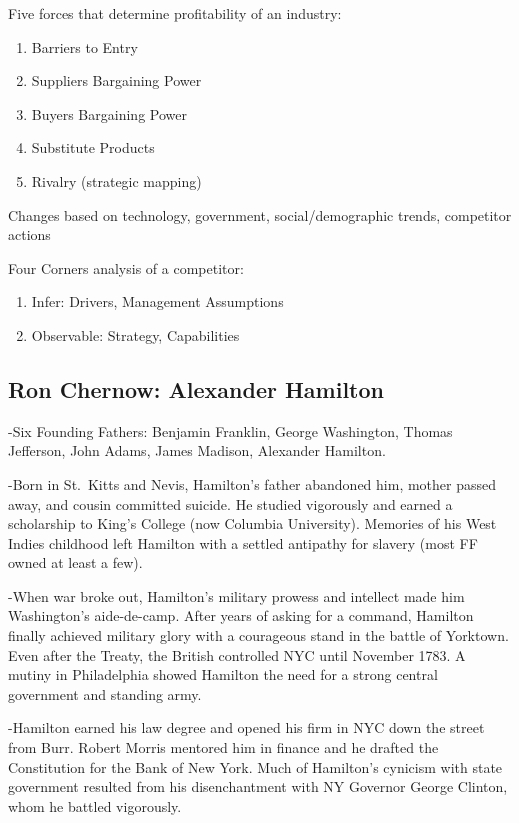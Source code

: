 \documentclass[
]{article}
\begin{document}
Five forces that determine profitability of an industry:

\begin{enumerate}
\def\labelenumi{\arabic{enumi}.}
\item
  Barriers to Entry
\item
  Suppliers Bargaining Power
\item
  Buyers Bargaining Power
\item
  Substitute Products
\item
  Rivalry (strategic mapping)
\end{enumerate}

Changes based on technology, government, social/demographic trends,
competitor actions

Four Corners analysis of a competitor:

\begin{enumerate}
\def\labelenumi{\arabic{enumi}.}
\item
  Infer: Drivers, Management Assumptions
\item
  Observable: Strategy, Capabilities
\end{enumerate}

\hypertarget{ron-chernow-alexander-hamilton}{%
\subsection{Ron Chernow: Alexander
Hamilton}\label{ron-chernow-alexander-hamilton}}

-Six Founding Fathers: Benjamin Franklin, George Washington, Thomas
Jefferson, John Adams, James Madison, Alexander Hamilton.

-Born in St.~Kitts and Nevis, Hamilton's father abandoned him, mother
passed away, and cousin committed suicide. He studied vigorously and
earned a scholarship to King's College (now Columbia University).
Memories of his West Indies childhood left Hamilton with a settled
antipathy for slavery (most FF owned at least a few).

-When war broke out, Hamilton's military prowess and intellect made him
Washington's aide-de-camp. After years of asking for a command, Hamilton
finally achieved military glory with a courageous stand in the battle of
Yorktown. Even after the Treaty, the British controlled NYC until
November 1783. A mutiny in Philadelphia showed Hamilton the need for a
strong central government and standing army.

-Hamilton earned his law degree and opened his firm in NYC down the
street from Burr. Robert Morris mentored him in finance and he drafted
the Constitution for the Bank of New York. Much of Hamilton's cynicism
with state government resulted from his disenchantment with NY Governor
George Clinton, whom he battled vigorously.
\end{document}
